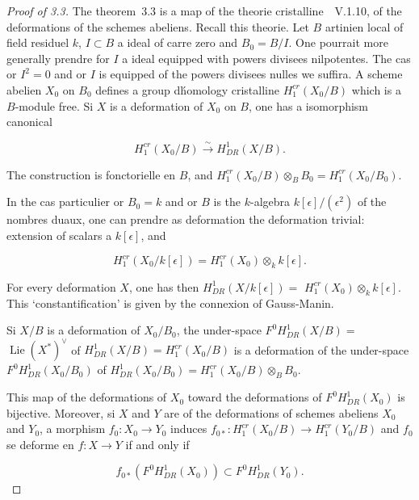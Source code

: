 \documentclass[11pt,a4paper]{article}
\theoremstyle{plain}
\theoremstyle{definition}
\DeclareMathOperator{\Lie}{Lie}
\begin{document}
\begin{proof}[Proof of 3.3]
The theorem~3.3 is a map of the theorie cristalline~\cite{Messing}~V.1.10, of the
deformations of the schemes abeliens. Recall this theorie. Let $B$ artinien
local of field residuel $k$, $I \subset B$ a ideal of carre zero and $B_0 = B/I$. One pourrait
more generally prendre for $I$ a ideal equipped with powers divisees
nilpotentes. The cas or $I^2 = 0$ and or $I$ is equipped of the powers divisees nulles
we suffira. A scheme abelien $X_0$ on $B_0$ defines a group d\'homology
cristalline $H^{cr}_1(X_0/B)$ which is a $B$-module free. Si $X$ is a deformation of
$X_0$ on $B$, one has a isomorphism canonical

\begin{equation}
H^{cr}_1(X_0/B) \xrightarrow{\sim} H^1_{DR}(X/B).
\end{equation}

The construction is fonctorielle en $B$, and $H^{cr}_1(X_0/B) \otimes_B B_0 =
H^{cr}_1(X_0/B_0)$.

In the cas particulier or $B_0 = k$ and or $B$ is the $k$-algebra $k[\epsilon]/(\epsilon^2)$ of the
nombres duaux, one can prendre as deformation the deformation trivial:
extension of scalars a $k[\epsilon]$, and

\begin{equation}
H^{cr}_1(X_0/k[\epsilon]) = H^{cr}_1(X_0) \otimes_k k[\epsilon].
\end{equation}

For every deformation $X$, one has then $H^1_{DR}(X/k[\epsilon]) =$
$H^{cr}_1(X_0) \otimes_k k[\epsilon]$. This
`constantification' is given by the connexion of Gauss-Manin.

Si $X/B$ is a deformation of $X_0/B_0$, the under-space $F^0 H^1_{DR}(X/B) =$
$\Lie(X^*)^\vee$ of $H^1_{DR}(X/B) = H^{cr}_1(X_0/B)$ is a deformation of the under-space
$F^0 H^1_{DR}(X_0/B_0)$ of $H^1_{DR}(X_0/B_0) = H^{cr}_1(X_0/B) \otimes_B B_0$.

This map of the deformations of $X_0$ toward the deformations of
$F^0 H^1_{DR}(X_0)$ is bijective. Moreover, si $X$ and $Y$ are of the deformations of schemes
abeliens $X_0$ and $Y_0$, a morphism $f_0 : X_0 \to Y_0$ induces $f_{0*}: H^{cr}_1(X_0/B) \to H^{cr}_1(Y_0/B)$
and $f_0$ se deforme en $f: X \to Y$ if and only if

\begin{equation}
f_{0*}(F^0 H^1_{DR}(X_0)) \subset F^0 H^1_{DR}(Y_0).
\end{equation}


\end{proof}
\end{document}
